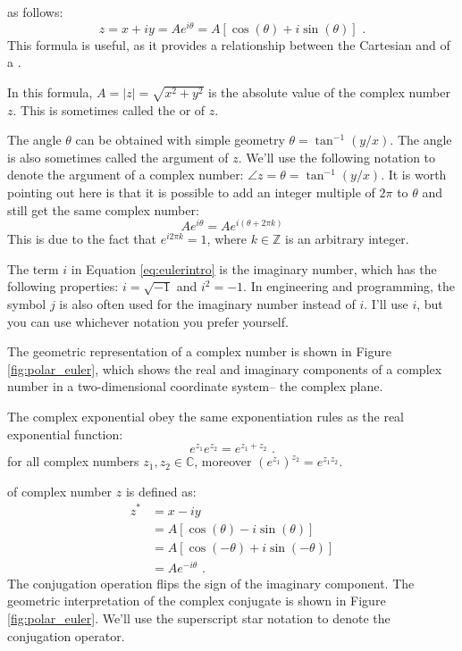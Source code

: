  as follows:
\begin{equation}
\boxed{
z = x + iy = A e^{i\theta} = A[\cos(\theta)+i\sin(\theta)]
}\,\,.
\label{eq:eulerintro}
\end{equation}
This formula is useful, as it provides a relationship between the Cartesian and  of a .

In this formula, $A = |z|=\sqrt{x^2 + y^2}$ is the absolute value of the complex number $z$. This is sometimes called the \emph{} or
\emph{} of $z$.

The angle $\theta$ can be obtained with simple geometry
$\theta=\tan^{-1}(y/x)$. The angle is also sometimes called the argument of $z$. We'll use the following notation to denote the argument of a complex number: $\angle z = \theta = \tan^{-1}(y/x)$. It is worth pointing out here is that it is possible to add an integer multiple of $2\pi$ to $\theta$ and still get the same complex number:
\begin{equation}
A e^{i\theta} = A e^{i(\theta + 2\pi k)}
\end{equation}
This is due to the fact that $e^{i2\pi k} = 1$, where
$k \in \mathbb{Z}$ is an arbitrary integer. 

The term $i$ in Equation \ref{eq:eulerintro} is the imaginary number, which has the following properties: $i=\sqrt{-1}$ and $i^2 = -1$. In engineering and programming, the symbol $j$ is also often used for the imaginary number instead of $i$. I'll use $i$, but you can use whichever notation you prefer yourself.

The geometric representation of a complex number is shown in
Figure \ref{fig:polar_euler}, which shows the real and imaginary
components of a complex number in a two-dimensional coordinate system-- the complex plane.

The complex exponential obey the same exponentiation rules as the real exponential function:
\begin{equation}
\boxed{
e^{z_{1}}e^{z_{2}} = e^{z_{1}+z_{2}}
}\,\,.
\label{eq:complexexponentiation}
\end{equation}
for all complex numbers $z_{1},z_{2}\in\mathbb{C}$, moreover $(e^{z_{1}})^{z_{2}}=e^{z_{1}z_{2}}$. 

 of complex number $z$ is defined as:
\begin{align}
z^* &= x - iy \\
    &=A[\cos(\theta)-i\sin(\theta)]\\
    &=A[\cos(-\theta)+i\sin(-\theta)]\\
    &=A e^{-i\theta}\,\,.
\end{align}
The conjugation operation flips the sign of the imaginary
component. The geometric interpretation of the complex conjugate is
shown in Figure \ref{fig:polar_euler}.  We'll use the superscript star notation to denote the conjugation operator.

